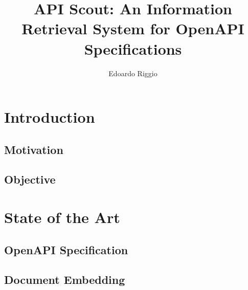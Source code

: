 \documentclass{layout/si-msc-proposal}
\author{Edoardo Riggio}
\title{API Scout: An Information Retrieval System for OpenAPI Specifications}
\begin{document}
    \maketitle


    \tableofcontents
    \listoffigures
    \newpage


    \section{Introduction}\label{sec:introduction}
    

    \subsection{Motivation}\label{subsec:motivation}
    

    \subsection{Objective}\label{subsec:objective}
    


    \section{State of the Art}\label{sec:state-of-the-art}

    \subsection{OpenAPI Specification}\label{subsec:openapi-specification}
    

    \subsection{Document Embedding}\label{subsec:document-embedding}
    
\end{document}
